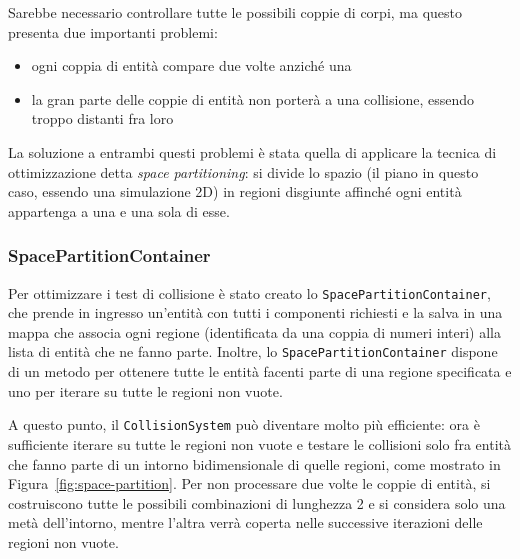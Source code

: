 Sarebbe necessario controllare tutte le possibili coppie di corpi, ma questo presenta due importanti problemi:
\begin{itemize}
    \item ogni coppia di entità compare due volte anziché una
    \item la gran parte delle coppie di entità non porterà a una collisione, essendo troppo distanti fra loro
\end{itemize}

La soluzione a entrambi questi problemi è stata quella di applicare la tecnica di ottimizzazione detta
\textit{space partitioning}: si divide lo spazio (il piano in questo caso, essendo una simulazione 2D) in regioni
disgiunte affinché ogni entità appartenga a una e una sola di esse.

\subsubsection{SpacePartitionContainer}
Per ottimizzare i test di collisione è stato creato lo \texttt{SpacePartitionContainer}, che prende in ingresso
un'entità con tutti i componenti richiesti e la salva in una mappa che associa ogni regione (identificata da una coppia
di numeri interi) alla lista di entità che ne fanno parte.
Inoltre, lo \texttt{SpacePartitionContainer} dispone di un metodo per ottenere tutte le entità facenti parte di una
regione specificata e uno per iterare su tutte le regioni non vuote.

A questo punto, il \texttt{CollisionSystem} può diventare molto più efficiente: ora è sufficiente iterare su tutte le
regioni non vuote e testare le collisioni solo fra entità che fanno parte di un intorno bidimensionale di quelle
regioni, come mostrato in Figura~\ref{fig:space-partition}.
Per non processare due volte le coppie di entità, si costruiscono tutte le possibili combinazioni di lunghezza 2 e si
considera solo una metà dell'intorno, mentre l'altra verrà coperta nelle successive iterazioni delle regioni non vuote.


